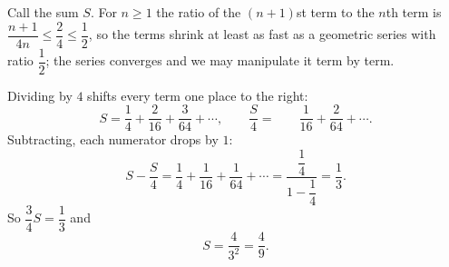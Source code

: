 Call the sum $S$. For $n\ge1$ the ratio of the $(n+1)$st term to the $n$th term is $\dfrac{n+1}{4n}\le\dfrac{2}{4}\le\dfrac{1}{2}$, so the terms shrink at least as fast as a geometric series with ratio $\dfrac{1}{2}$; the series converges and we may manipulate it term by term.

Dividing by $4$ shifts every term one place to the right:
\[S=\dfrac{1}{4}+\dfrac{2}{16}+\dfrac{3}{64}+\cdots,\qquad \dfrac{S}{4}=\phantom{\dfrac{1}{4}+{}}\dfrac{1}{16}+\dfrac{2}{64}+\cdots.\]
Subtracting, each numerator drops by $1$:
\[S-\dfrac{S}{4}=\dfrac{1}{4}+\dfrac{1}{16}+\dfrac{1}{64}+\cdots=\dfrac{\dfrac{1}{4}}{1-\dfrac{1}{4}}=\dfrac{1}{3}.\]
So $\dfrac{3}{4}S=\dfrac{1}{3}$ and
\[S=\dfrac{4}{3^2}=\boxed{\dfrac{4}{9}}.\]
